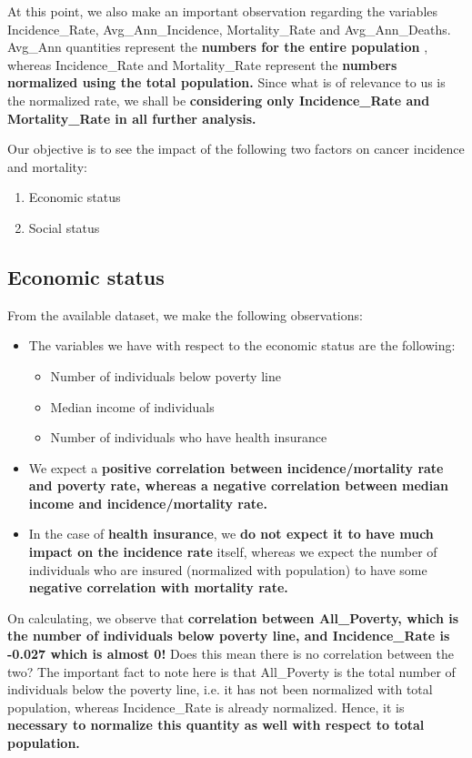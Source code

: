 \documentclass[conference]{IEEEtran}
\begin{document}
At this point, we also make an important observation regarding the variables Incidence\_Rate, Avg\_Ann\_Incidence, Mortality\_Rate and Avg\_Ann\_Deaths. Avg\_Ann quantities represent the \textbf{numbers for the entire population} , whereas Incidence\_Rate and Mortality\_Rate represent the \textbf{numbers normalized using the total population.} Since what is of relevance to us is the normalized rate, we shall be \textbf{considering only Incidence\_Rate and Mortality\_Rate in all further analysis.} 

Our objective is to see the impact of the following two factors on cancer incidence and mortality:
\begin{enumerate}
    \item Economic status
    \item Social status
\end{enumerate}

\subsection{Economic status}

From the available dataset, we make the following observations:

\begin{itemize}
    \item The variables we have with respect to the economic status are the following:
    \begin{itemize}
        \item Number of individuals below poverty line
        \item Median income of individuals
        \item Number of individuals who have health insurance
    \end{itemize}
    \item We expect a \textbf{positive correlation between incidence/mortality rate and poverty rate, whereas a negative correlation between median income and incidence/mortality rate.}
    \item In the case of \textbf{health insurance}, we \textbf{do not expect it to have much impact on the incidence rate} itself, whereas we expect the number of individuals who are insured (normalized with population) to have some \textbf{negative correlation with mortality rate.}
\end{itemize}


On calculating, we observe that \textbf{correlation between All\_Poverty, which is the number of individuals below poverty line, and Incidence\_Rate is -0.027 which is almost 0!} Does this mean there is no correlation between the two? The important fact to note here is that All\_Poverty is the total number of individuals below the poverty line, i.e. it has not been normalized with total population, whereas Incidence\_Rate is already normalized. Hence, it is \textbf{necessary to normalize this quantity as well with respect to total population.}
\end{document}
